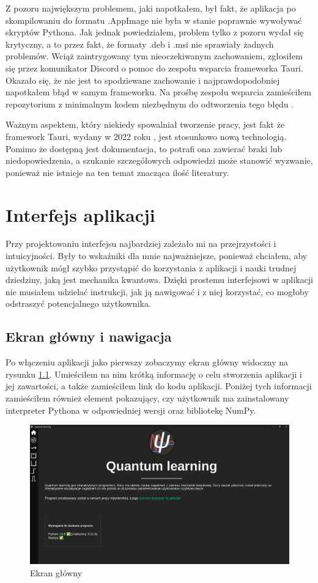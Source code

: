 \documentclass{SGGW-thesis}
\begin{document}
	Z pozoru największym problemem, jaki napotkałem, był fakt, że aplikacja po skompilowaniu do formatu .AppImage nie była w stanie poprawnie wywoływać skryptów Pythona. Jak jednak powiedziałem, problem tylko z pozoru wydał się krytyczny, a to przez fakt, że formaty .deb i .msi nie sprawiały żadnych problemów. Wciąż zaintrygowany tym nieoczekiwanym zachowaniem, zgłosiłem się przez komunikator Discord o pomoc do zespołu wsparcia frameworka Tauri. Okazało się, że nie jest to spodziewane zachowanie i najprawdopodobniej napotkałem błąd w samym frameworku. Na prośbę zespołu wsparcia zamieściłem repozytorium z minimalnym kodem niezbędnym do odtworzenia tego błędu \cite{app-error-repo}.
	
	Ważnym aspektem, który niekiedy spowalniał tworzenie pracy, jest fakt że framework Tauri, wydany w 2022 roku \cite{tauri-release}, jest stosunkowo nową technologią. Pomimo że dostępną jest dokumentacja, to potrafi ona zawierać braki lub niedopowiedzenia, a szukanie szczegółowych odpowiedzi może stanowić wyzwanie, ponieważ nie istnieje na ten temat znacząca ilość literatury.
	

\chapter{Interfejs aplikacji}
	Przy projektowaniu interfejsu najbardziej zależało mi na przejrzystości i intuicyjności. Były to wskaźniki dla mnie najważniejsze, ponieważ chciałem, aby użytkownik mógł szybko przystąpić do korzystania z aplikacji i nauki trudnej dziedziny, jaką jest mechanika kwantowa. Dzięki prostemu interfejsowi w aplikacji nie musiałem udzielać instrukcji, jak ją nawigować i z niej korzystać, co mogłoby odstraszyć potencjalnego użytkownika.
	\section{Ekran główny i nawigacja}
	Po włączeniu aplikacji jako pierwszy zobaczymy ekran główny widoczny na rysunku  \ref{fig:main-page}. Umieściłem na nim krótką informację o celu stworzenia aplikacji i jej zawartości, a także zamieściłem link do kodu aplikacji. Poniżej tych informacji zamieściłem również element pokazujący, czy użytkownik ma zainstalowany interpreter Pythona w odpowiedniej wersji oraz bibliotekę NumPy.
	
	\begin{figure}[H]
	\includegraphics[width=\textwidth,height=\textheight,keepaspectratio]{main page.png} 
	\caption{Ekran główny}
	\label{fig:main-page}
	\end{figure}
	
\end{document}
